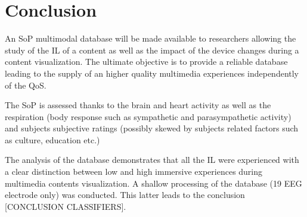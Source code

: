 \section{Conclusion}

An \ac{SoP} multimodal database will be made available to researchers allowing the study of the \ac{IL} of a content as well as the impact of the device changes during a content visualization. The ultimate objective is to provide a reliable database leading to the supply of an higher quality multimedia experiences independently of the \ac{QoS}.

The \ac{SoP} is assessed thanks to the brain and heart activity as well as the respiration (body response such as sympathetic and parasympathetic activity) and subjects subjective ratings (possibly skewed by subjects related factors such as culture, education etc.)

The analysis of the database demonstrates that all the \ac{IL} were experienced with a clear distinction between low and high immersive experiences during multimedia contents visualization.
A shallow processing of the database (19 \ac{EEG} electrode only) was conducted. This latter leads to the conclusion [CONCLUSION CLASSIFIERS].